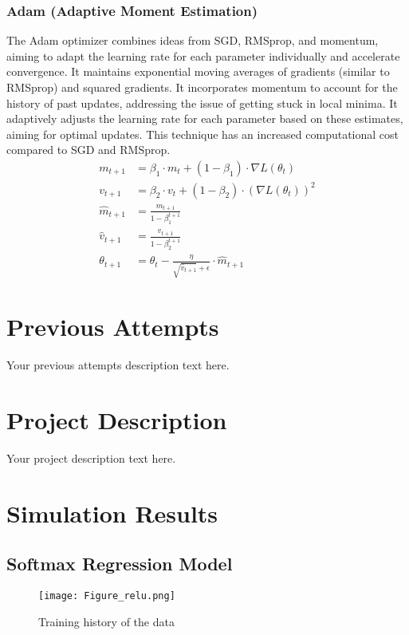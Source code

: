 \documentclass{article}
\begin{document}
\subsubsection{Adam (Adaptive Moment Estimation)}
The Adam optimizer combines ideas from SGD, RMSprop, and momentum, aiming to adapt the learning rate for each parameter individually and accelerate convergence.
It maintains exponential moving averages of gradients (similar to RMSprop) and squared gradients.
It incorporates momentum to account for the history of past updates, addressing the issue of getting stuck in local minima.
It adaptively adjusts the learning rate for each parameter based on these estimates, aiming for optimal updates. This technique has an increased computational cost compared to SGD and RMSprop.
\begin{align*}
m_{t+1} & = \beta_1 \cdot m_t + (1 - \beta_1) \cdot \nabla L(\theta_t) \\
v_{t+1} & = \beta_2 \cdot v_t + (1 - \beta_2) \cdot (\nabla L(\theta_t))^2 \\
\hat{m}_{t+1} & = \frac{m_{t+1}}{1 - \beta_1^{t+1}} \\
\hat{v}_{t+1} & = \frac{v_{t+1}}{1 - \beta_2^{t+1}} \\
\theta_{t+1} & = \theta_t - \frac{\eta}{\sqrt{\hat{v}_{t+1}} + \epsilon} \cdot \hat{m}_{t+1}
\end{align*}


\section{Previous Attempts}
Your previous attempts description text here.

\section{Project Description}
Your project description text here.

\section{Simulation Results}

\subsection{Softmax Regression Model}

\begin{figure}[h]
\caption{Training history of the data}
\centering
\texttt{[image: Figure\_relu.png]}
\end{figure}
\end{document}

